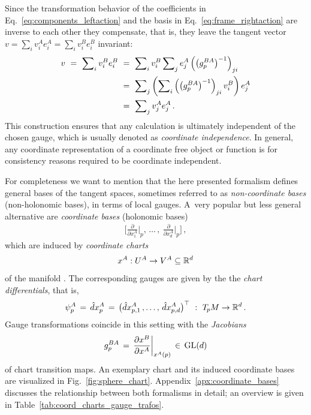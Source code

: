 Since the transformation behavior of the coefficients in Eq.~\eqref{eq:components_leftaction} and the basis in Eq.~\eqref{eq:frame_rightaction} are inverse to each other they compensate, that is, they leave the tangent vector $v = \sum_i v_i^A e_{i}^A = \sum_i v_i^B e_{i}^B$ invariant:
\begin{align}\label{eq:vector_in_different_bases}
    v\ =\ \sum\nolimits_i v_i^B e_{i}^B
    \ &=\ \sum\nolimits_i v_i^B \sum\nolimits_j e_{j}^A \left(\left(g_p^{BA}\right)^{-1}\right)_{ji} \notag\\
    \ &=\ \sum\nolimits_j \left(\sum\nolimits_i \left(\left(g_p^{BA}\right)^{-1}\right)_{ji} v_i^B\right) e_{j}^A \notag\\
    \ &=\ \sum\nolimits_j v_j^A e_{j}^A \,.
\end{align}
This construction ensures that any calculation is ultimately independent of the chosen gauge, which is usually denoted as \emph{coordinate independence}.
In general, any coordinate representation of a coordinate free object or function is for consistency reasons required to be coordinate independent.


For completeness we want to mention that the here presented formalism defines general bases of the tangent spaces, sometimes referred to as \emph{non-coordinate bases} (non-holonomic bases), in terms of local gauges.
A~very popular but less general alternative are \emph{coordinate bases} (holonomic bases)
\begin{align}
    \bigg[\frac{\partial}{\partial x^A_1} \bigg|_p ,\,\dots\,,\ \frac{\partial}{\partial x^A_d} \bigg|_p \bigg] \,,
\end{align}
which are induced by \emph{coordinate charts}
\begin{align}\label{eq:chart_21}
    x^A: U^A \to V^A \subseteq \mathbb{R}^d
\end{align}
of the manifold \cite{nakahara2003geometry}.
The corresponding gauges are given by the the \emph{chart differentials}, that is,
\begin{align}
    \psi_p^A \,=\, \hat{d}x^A_p \,=\, \big( \hat{d}x^A_{p,1} \,,\dots,\, \hat{d}x^A_{p,d} \big)^\top\ :\ T_{\mkern-1.5mu p}\mkern-.5muM \to \mathbb{R}^d \,.
\end{align}
Gauge transformations coincide in this setting with the \emph{Jacobians}
\begin{align}
    g_p^{BA} \,=\, \frac{\partial x^B}{\partial x^A} \bigg|_{x^A(p)} \,\in\, \operatorname{GL}(d)
\end{align}
of chart transition maps.
An exemplary chart and its induced coordinate bases are visualized in Fig.~\ref{fig:sphere_chart}.
Appendix~\ref{apx:coordinate_bases} discusses the relationship between both formalisms in detail; an overview is given in Table~\ref{tab:coord_charts_gauge_trafos}.


